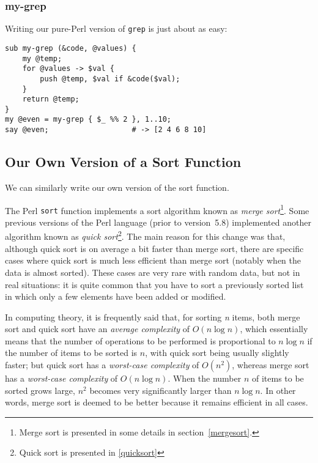 \subsubsection{my-grep}

Writing our pure-Perl version of {\tt grep} is just about as 
easy:
\begin{verbatim}
sub my-grep (&code, @values) { 
    my @temp;
    for @values -> $val {
        push @temp, $val if &code($val);
    }
    return @temp;
}
my @even = my-grep { $_ %% 2 }, 1..10; 
say @even;                   # -> [2 4 6 8 10]
\end{verbatim}

\subsection{Our Own Version of a Sort Function}
\label{combsort}

We can similarly write our own version of the sort 
function. 


The Perl {\tt sort} function implements a sort 
algorithm known as \emph{merge sort}\footnote{Merge 
sort is presented in some details in 
section~\ref{mergesort}.}.  Some 
previous versions of the Perl language (prior to 
version~5.8) implemented another algorithm known 
as \emph{quick sort}\footnote{Quick sort is presented 
in \ref{quicksort}}. The main reason for this 
change was that, although quick sort is on average  
a bit faster than merge sort, there are specific 
cases where quick sort is much less efficient than 
merge sort (notably when the data is almost sorted). 
These cases are very rare with random data, but not 
in real situations: it is quite common that you have 
to sort a previously sorted list in which only a 
few elements have been added or modified.

In computing theory, it is frequently said that, for 
sorting \emph{n} items, both merge sort and quick 
sort have an \emph{average complexity} of $O(n \log n)$, 
which essentially means that the number of operations 
to be performed is proportional to $n \log n$ if 
the number of items to be sorted is $n$, 
with quick sort being usually slightly faster; but 
quick sort has a \emph{worst-case complexity} of 
$O(n^{2})$, whereas merge sort has a \emph{worst-case 
complexity} of $O(n \log n)$. When the number $n$ of 
items to be sorted grows large, $n^{2}$ becomes 
very significantly larger than $n \log n$. In other 
words, merge sort is deemed to be better because it 
remains efficient in all cases.

